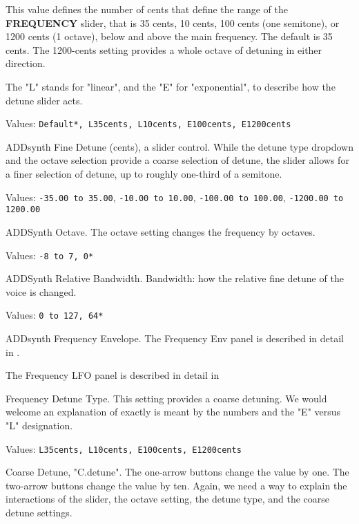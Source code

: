    This value defines the number of cents that define the range of the
   \textbf{FREQUENCY} slider, that is 35 cents, 10 cents, 100 cents (one
   semitone), or 1200 cents (1 octave), below and above the main
   frequency.  The default is 35 cents.  The 1200-cents setting provides a
   whole octave of detuning in either direction.

   The "L" stands for "linear", and the "E" for "exponential", to
   describe how the detune slider acts.

   Values: \texttt{Default*, L35cents, L10cents, E100cents, E1200cents}

   ADDsynth Fine Detune (cents), a slider control.
   While the detune type dropdown and the octave selection provide a coarse
   selection of detune, the slider allows for a finer selection of detune,
   up to roughly one-third of a semitone.

   Values:
      \texttt{-35.00 to 35.00},
      \texttt{-10.00 to 10.00},
      \texttt{-100.00 to 100.00},
      \texttt{-1200.00 to 1200.00}

   ADDSynth Octave.
   The octave setting changes the frequency by octaves.

   Values: \texttt{-8 to 7, 0*}

   ADDSynth Relative Bandwidth.
   Bandwidth: how the relative fine detune of the voice is changed.

   Values: \texttt{0 to 127, 64*}

   ADDsynth Frequency Envelope.
   The Frequency Env panel is described in detail in
   .

   The Frequency LFO panel is described in detail in

   Frequency Detune Type.
   This setting provides a coarse detuning.
   We would welcome an explanation of exactly is meant by the numbers and
   the "E" versus "L" designation.

   Values: \texttt{L35cents, L10cents, E100cents, E1200cents}

   Coarse Detune, "C.detune".
   The one-arrow buttons change the value by one.
   The two-arrow buttons change the value by ten.
   Again, we need a way to explain the interactions of the slider, the
   octave setting, the detune type, and the coarse detune settings.


